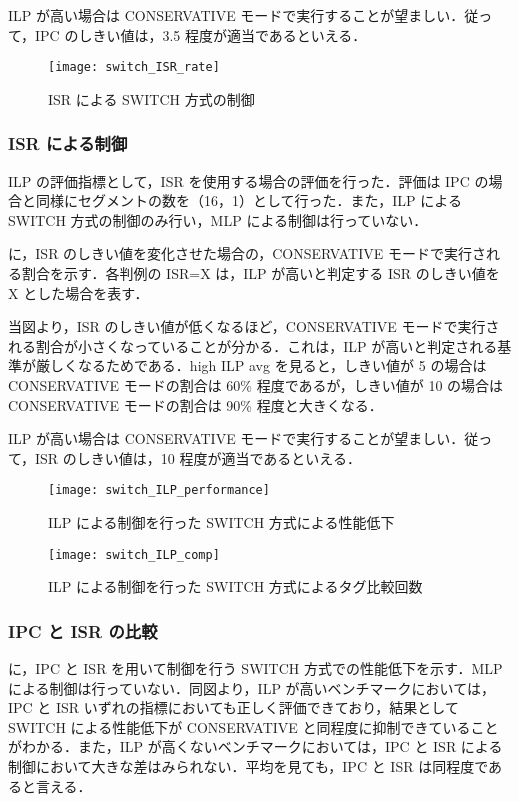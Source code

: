 ILP が高い場合は CONSERVATIVE モードで実行することが望ましい．従って，IPC のしきい値は，3.5 程度が適当であるといえる．

\begin{figure}[htb]
  \centering
  \texttt{[image: switch\_ISR\_rate]}
  \caption{ISR による SWITCH 方式の制御}
  \label{fig:switch_ISR_rate}
\end{figure}

\subsubsection{ISR による制御}
ILP の評価指標として，ISR を使用する場合の評価を行った．評価は IPC の場合と同様にセグメントの数を（16，1）として行った．また，ILP による SWITCH 方式の制御のみ行い，MLP による制御は行っていない．

に，ISR のしきい値を変化させた場合の，CONSERVATIVE モードで実行される割合を示す．各判例の ISR=X は，ILP が高いと判定する ISR のしきい値を X とした場合を表す．

当図より，ISR のしきい値が低くなるほど，CONSERVATIVE モードで実行される割合が小さくなっていることが分かる．これは，ILP が高いと判定される基準が厳しくなるためである．high ILP avg を見ると，しきい値が 5 の場合は CONSERVATIVE モードの割合は 60\% 程度であるが，しきい値が 10 の場合は CONSERVATIVE モードの割合は 90\% 程度と大きくなる．

ILP が高い場合は CONSERVATIVE モードで実行することが望ましい．従って，ISR のしきい値は，10 程度が適当であるといえる．

\begin{figure}[htb]
  \centering
  \texttt{[image: switch\_ILP\_performance]}
  \caption{ILP による制御を行った SWITCH 方式による性能低下}
  \label{fig:switch_ILP_performance}
\end{figure}

\begin{figure}[htb]
  \centering
  \texttt{[image: switch\_ILP\_comp]}
  \caption{ILP による制御を行った SWITCH 方式によるタグ比較回数}
  \label{fig:switch_ILP_comp}
\end{figure}

\subsubsection{IPC と ISR の比較}
に，IPC と ISR を用いて制御を行う SWITCH 方式での性能低下を示す．MLP による制御は行っていない．同図より，ILP が高いベンチマークにおいては，IPC と ISR いずれの指標においても正しく評価できており，結果として SWITCH による性能低下が CONSERVATIVE と同程度に抑制できていることがわかる．また，ILP が高くないベンチマークにおいては，IPC と ISR による制御において大きな差はみられない．平均を見ても，IPC と ISR は同程度であると言える．

